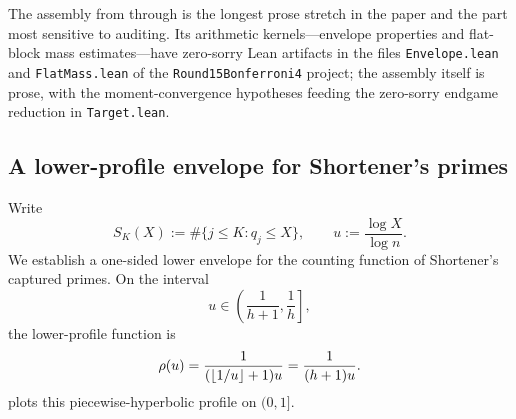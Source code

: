 \begin{sloppypar}
The assembly from  through
 is the longest prose stretch
in the paper and the part most sensitive to auditing.  Its arithmetic
kernels---envelope properties and flat-block mass estimates---have
zero-sorry Lean artifacts in the files \texttt{Envelope.lean} and
\texttt{FlatMass.lean} of the \texttt{Round15Bonferroni4} project; the
assembly itself is prose, with the moment-convergence hypotheses feeding
the zero-sorry endgame reduction in \texttt{Target.lean}.
\end{sloppypar}

\subsection{A lower-profile envelope for Shortener's primes}

Write
\[
  S_K(X) := \#\{j\le K : q_j \le X\},
  \qquad
  u := \frac{\log X}{\log n}.
\]
We establish a one-sided lower envelope for the counting function of
Shortener's captured primes.  On the interval
\[
  u \in \left(\frac{1}{h+1},\frac1h\right],
\]
the lower-profile function is
\[
  \rho(u) = \frac{1}{(\lfloor 1/u \rfloor+1)u} = \frac{1}{(h+1)u}.
\]
 plots this piecewise-hyperbolic profile on $(0, 1]$.

